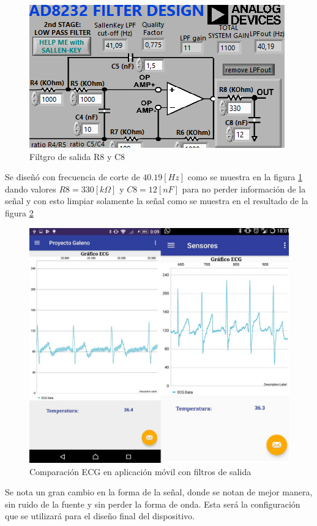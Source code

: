 \begin{figure}[H]
\centering
\includegraphics[scale=0.75]{figuras/ecg/filtroout.png}
\caption{Filtgro de salida R8 y C8}
\label{filtroout}
\end{figure}

Se diseñó con frecuencia de corte de $40.19[Hz]$ como se muestra en la figura \ref{filtroout} dando valores $R8 = 330[k\Omega]$ y $C8 = 12[nF]$ para no perder información de la señal y con esto limpiar solamente la señal como se muestra en el resultado de la figura \ref{ecgbonito}

\begin{figure}[H]
\centering
\includegraphics[scale=0.25]{figuras/ecg/ecgappbueno.jpg}
\caption{Comparación ECG en aplicación móvil con filtros de salida}
\label{ecgbonito}
\end{figure}

Se nota un gran cambio en la forma de la señal, donde se notan de mejor manera, sin ruido de la fuente y sin perder la forma de onda. Esta será la configuración que se utilizará para el diseño final del dispositivo.

